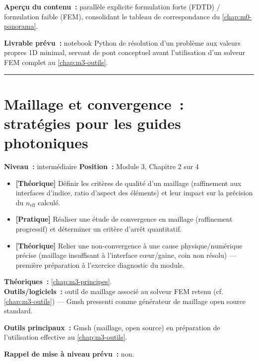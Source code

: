 \noindent\textbf{Aperçu du contenu~:} parallèle explicite formulation forte (FDTD) / formulation faible (FEM), consolidant le tableau de correspondance du \cref{chap:m0-panorama}.

\noindent\textbf{Livrable prévu~:} notebook Python de résolution d'un problème aux valeurs propres 1D minimal, servant de \og pont\fg{} conceptuel avant l'utilisation d'un solveur FEM complet au \cref{chap:m3-outils}.

\bigskip\hrule\bigskip

\chapter{Maillage et convergence~: stratégies pour les guides photoniques}
\label{chap:m3-maillage}

\noindent\textbf{Niveau~:} intermédiaire \hfill \textbf{Position~:} Module 3, Chapitre 2 sur 4

\begin{objectifs}
\begin{itemize}[leftmargin=1.4em]
  \item \textbf{[Théorique]} Définir les critères de qualité d'un maillage (raffinement aux interfaces d'indice, ratio d'aspect des éléments) et leur impact sur la précision du $n_{\text{eff}}$ calculé.
  \item \textbf{[Pratique]} Réaliser une étude de convergence en maillage (raffinement progressif) et déterminer un critère d'arrêt quantitatif.
  \item \textbf{[Théorique]} Relier une non-convergence à une cause physique/numérique précise (maillage insuffisant à l'interface cœur/gaine, coin non résolu) — première préparation à l'exercice diagnostic du module.
\end{itemize}
\end{objectifs}

\begin{prerequis}
\textbf{Théoriques~:} \cref{chap:m3-principes}.\\
\textbf{Outils/logiciels~:} outil de maillage associé au solveur FEM retenu (cf. \cref{chap:m3-outils}) — Gmsh pressenti comme générateur de maillage open source standard.
\end{prerequis}

\noindent\textbf{Outils principaux~:} Gmsh (maillage, open source) en préparation de l'utilisation effective au \cref{chap:m3-outils}.

\noindent\textbf{Rappel de mise à niveau prévu~:} non.

